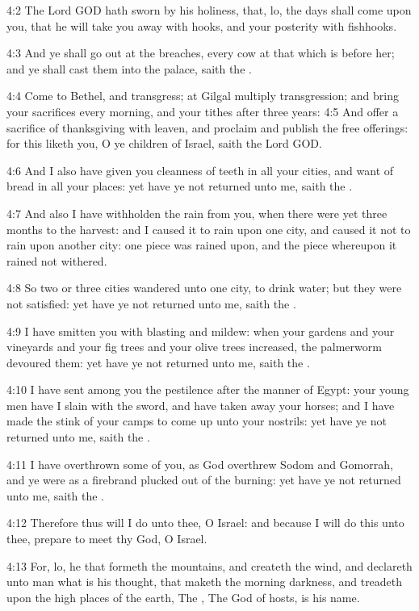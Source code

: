 4:2 The Lord GOD hath sworn by his holiness, that, lo, the days shall
come upon you, that he will take you away with hooks, and your
posterity with fishhooks.

4:3 And ye shall go out at the breaches, every cow at that which is
before her; and ye shall cast them into the palace, saith the \LORD.

4:4 Come to Bethel, and transgress; at Gilgal multiply transgression;
and bring your sacrifices every morning, and your tithes after three
years: 4:5 And offer a sacrifice of thanksgiving with leaven, and
proclaim and publish the free offerings: for this liketh you, O ye
children of Israel, saith the Lord GOD.

4:6 And I also have given you cleanness of teeth in all your cities,
and want of bread in all your places: yet have ye not returned unto
me, saith the \LORD.

4:7 And also I have withholden the rain from you, when there were yet
three months to the harvest: and I caused it to rain upon one city,
and caused it not to rain upon another city: one piece was rained
upon, and the piece whereupon it rained not withered.

4:8 So two or three cities wandered unto one city, to drink water; but
they were not satisfied: yet have ye not returned unto me, saith the
\LORD.

4:9 I have smitten you with blasting and mildew: when your gardens and
your vineyards and your fig trees and your olive trees increased, the
palmerworm devoured them: yet have ye not returned unto me, saith the
\LORD.

4:10 I have sent among you the pestilence after the manner of Egypt:
your young men have I slain with the sword, and have taken away your
horses; and I have made the stink of your camps to come up unto your
nostrils: yet have ye not returned unto me, saith the \LORD.

4:11 I have overthrown some of you, as God overthrew Sodom and
Gomorrah, and ye were as a firebrand plucked out of the burning: yet
have ye not returned unto me, saith the \LORD.

4:12 Therefore thus will I do unto thee, O Israel: and because I will
do this unto thee, prepare to meet thy God, O Israel.

4:13 For, lo, he that formeth the mountains, and createth the wind,
and declareth unto man what is his thought, that maketh the morning
darkness, and treadeth upon the high places of the earth, The \LORD,
The God of hosts, is his name.

